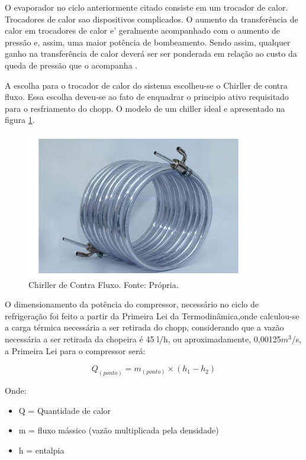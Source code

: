             O evaporador no ciclo anteriormente citado consiste em um trocador de calor.
            Trocadores de calor sao dispositivos complicados. O aumento da transferência de calor em
            trocadores de calor e’ geralmente acompanhado com o aumento de pressão e, assim, uma
            maior potência de bombeamento. Sendo assim, qualquer ganho na transferência de calor
            deverá ser ser ponderada em relação ao custo da queda de pressão que o acompanha \cite{boles}.

            A escolha para o trocador de calor do sistema escolheu-se o Chirller de contra fluxo.
            Essa escolha deveu-se ao fato de enquadrar o principio ativo requisitado para o resfriamento
            do chopp. O modelo de um chiller ideal e apresentado na figura \ref{chirller-contra-fluxo}.

            \begin{figure}[!htb]
                \centering
                \includegraphics[scale= 0.7]{figuras/chirller-contra-fluxo.png}
                \caption{Chirller de Contra Fluxo. Fonte: Própria.}
                \label{chirller-contra-fluxo}
            \end{figure}

            O dimensionamento da potência do compressor, necessário no ciclo de
            refrigeração foi feito a partir da Primeira Lei da Termodinâmica,onde calculou-se a
            carga térmica necessária a ser retirada do chopp, considerando que a vazão
            necessária a ser retirada da chopeira é 45 l/h, ou aproximadamente, 0,00125$m^3$/s, a
            Primeira Lei para o compressor será:

            \begin{equation}
                Q_{(ponto)} = m_{(ponto)} \times (h_1 - h_2)
            \end{equation}

            Onde:
            \begin{itemize}
                \item Q = Quantidade de calor
                \item m = fluxo mássico (vazão multiplicada pela densidade)
                \item h = entalpia
            \end{itemize}

